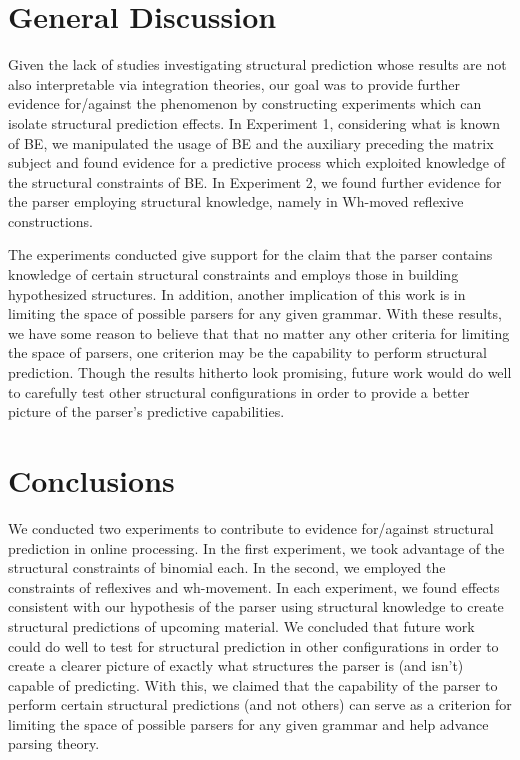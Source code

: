 \documentclass[12pt]{article}
\begin{document}
\section{General Discussion}
Given the lack of studies investigating structural prediction whose results are not also interpretable via integration theories, our goal was to provide further evidence for/against the phenomenon by constructing experiments which can isolate structural prediction effects. In Experiment 1, considering what is known of BE, we manipulated the usage of BE and the auxiliary preceding the matrix subject and found evidence for a predictive process which exploited knowledge of the structural constraints of BE. In Experiment 2, we found further evidence for the parser employing structural knowledge, namely in Wh-moved reflexive constructions.

The experiments conducted give support for the claim that the parser contains knowledge of certain structural constraints and employs those in building hypothesized structures. In addition, another implication of this work is in limiting the space of possible parsers for any given grammar. With these results, we have some reason to believe that that no matter any other criteria for limiting the space of parsers, one criterion may be the capability to perform structural prediction. Though the results hitherto look promising, future work would do well to carefully test other structural configurations in order to provide a better picture of the parser's predictive capabilities. 

\section{Conclusions}
We conducted two experiments to contribute to evidence for/against structural prediction in online processing. In the first experiment, we took advantage of the structural constraints of binomial each. In the second, we employed the constraints of reflexives and wh-movement. In each experiment, we found effects consistent with our hypothesis of the parser using structural knowledge to create structural predictions of upcoming material. We concluded that future work could do well to test for structural prediction in other configurations in order to create a clearer picture of exactly what structures the parser is (and isn't) capable of predicting. With this, we claimed that the capability of the parser to perform certain structural predictions (and not others) can serve as a criterion for limiting the space of possible parsers for any given grammar and help advance parsing theory. 



\end{document}
